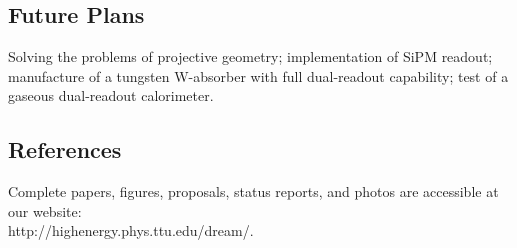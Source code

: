 \subsection{Future Plans}
Solving the problems of projective geometry; implementation of SiPM readout; manufacture of a tungsten W-absorber with full dual-readout capability; test of a gaseous dual-readout calorimeter.
\subsection{References}
Complete papers, figures, proposals, status reports, and photos are accessible at our website: \\
 http://highenergy.phys.ttu.edu/dream/.
